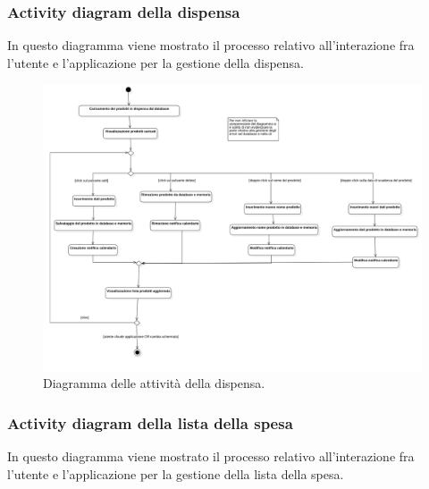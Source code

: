 \documentclass{article}
\begin{document}
\subsubsection{Activity diagram della dispensa}

In questo diagramma viene mostrato il processo relativo all'interazione fra l'utente e l'applicazione per la gestione della dispensa. 

\begin{figure}[H]
    \includegraphics[width=\linewidth]{images/activity-pantry.png}
    \caption{Diagramma delle attività della dispensa.}
    \label{fig:actpantry}
\end{figure}

\subsubsection{Activity diagram della lista della spesa}

In questo diagramma viene mostrato il processo relativo all'interazione fra l'utente e l'applicazione per la gestione della lista della spesa.
\end{document}
